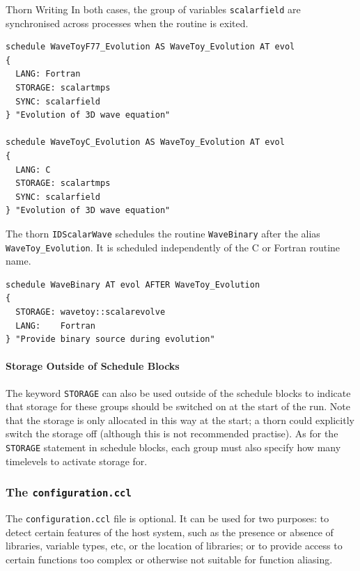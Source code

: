 \begin{cactuspart}{Thorn Writing}
In both cases, the group of variables \texttt{scalarfield} are synchronised
across processes when the routine is exited.
\begin{verbatim}
schedule WaveToyF77_Evolution AS WaveToy_Evolution AT evol
{
  LANG: Fortran
  STORAGE: scalartmps
  SYNC: scalarfield
} "Evolution of 3D wave equation"

schedule WaveToyC_Evolution AS WaveToy_Evolution AT evol
{
  LANG: C
  STORAGE: scalartmps
  SYNC: scalarfield
} "Evolution of 3D wave equation"
\end{verbatim}
The thorn \texttt{IDScalarWave} schedules the routine \texttt{WaveBinary}
after the alias \texttt{WaveToy\_Evolution}. It is scheduled independently of
the C or Fortran routine name.
\begin{verbatim}
schedule WaveBinary AT evol AFTER WaveToy_Evolution
{
  STORAGE: wavetoy::scalarevolve
  LANG:    Fortran
} "Provide binary source during evolution"
\end{verbatim}

\paragraph{Storage Outside of Schedule Blocks}
The keyword \texttt{STORAGE} can also be used outside of the schedule
blocks to indicate that storage for these groups should be switched on
at the start of the run. Note that the storage is only allocated in
this way at the start; a thorn could explicitly switch the storage off
(although this is not recommended practise). As for the \texttt{STORAGE}
statement in schedule blocks, each group must also specify how many
timelevels to activate storage for.


\subsubsection{The \texttt{configuration.ccl}}
\label{subsec:configuration_ccl}

The \texttt{configuration.ccl} file is optional.  It can be used for two
purposes: to detect certain features of the host system, such as the
presence or absence of libraries, variable types, etc, or the
location of libraries; or to provide access to certain functions too
complex or otherwise not suitable for function aliasing.


\end{cactuspart}
